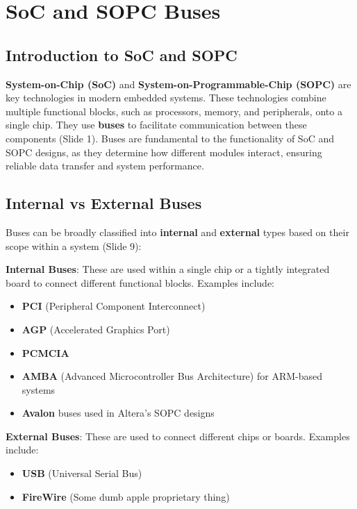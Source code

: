 \documentclass[
  14pt,
  a4paper,
  numbers=noendperiod,
  headinclude=true,
  footinclude=true,
  DIV=calc]{scrreprt}
\begin{document}
\chapter{SoC and SOPC Buses}\label{soc-and-sopc-buses}

\section{Introduction to SoC and
SOPC}\label{introduction-to-soc-and-sopc}

\textbf{System-on-Chip (SoC)} and \textbf{System-on-Programmable-Chip
(SOPC)} are key technologies in modern embedded systems. These
technologies combine multiple functional blocks, such as processors,
memory, and peripherals, onto a single chip. They use \textbf{buses} to
facilitate communication between these components (Slide 1). Buses are
fundamental to the functionality of SoC and SOPC designs, as they
determine how different modules interact, ensuring reliable data
transfer and system performance.

\section{Internal vs External Buses}\label{internal-vs-external-buses}

Buses can be broadly classified into \textbf{internal} and
\textbf{external} types based on their scope within a system (Slide 9):

\textbf{Internal Buses}: These are used within a single chip or a
tightly integrated board to connect different functional blocks.
Examples include:

\begin{itemize}
\item
  \textbf{PCI} (Peripheral Component Interconnect)
\item
  \textbf{AGP} (Accelerated Graphics Port)
\item
  \textbf{PCMCIA}
\item
  \textbf{AMBA} (Advanced Microcontroller Bus Architecture) for
  ARM-based systems
\item
  \textbf{Avalon} buses used in Altera's SOPC designs
\end{itemize}

\textbf{External Buses}: These are used to connect different chips or
boards. Examples include:

\begin{itemize}
\item
  \textbf{USB} (Universal Serial Bus)
\item
  \textbf{FireWire} (Some dumb apple proprietary thing)
\end{itemize}
\end{document}
